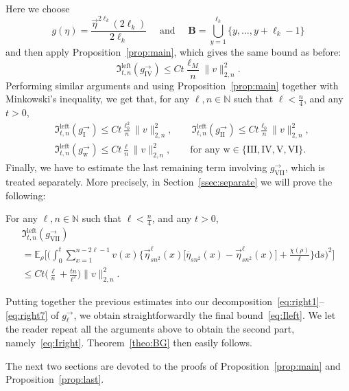 \documentclass[10pt]{amsart}
\theoremstyle{definition}\newtheorem{defi}[theo]{Definition}\newtheorem{rema}[theo]{Remark}\newtheorem{exam}[theo]{Example}\newtheorem{exem}[theo]{Example}\newtheorem{nota}[theo]{Notation}
\newcommand{\bfB}{\mathbf{B}}
\newcommand*{\rmw}{\mathrm{w}}
\newcommand*{\rmleft}{\mathrm{left}}
\newcommand*{\rmI}{\mathrm{I}}
\newcommand*{\rmII}{\mathrm{II}}
\newcommand*{\rmIII}{\mathrm{III}}
\newcommand*{\rmIV}{\mathrm{IV}}
\newcommand*{\rmV}{\mathrm{V}}
\newcommand*{\rmVI}{\mathrm{VI}}
\newcommand*{\rmVII}{\mathrm{VII}}
\newcommand{\bb}[1]{{\mathbb #1}}
\newcommand{\mf}[1]{{\mathfrak #1}}
\renewcommand\vec[1]{\overrightarrow{#1}}
\renewcommand{\bar}{\overline}
\renewcommand{\leq}{\leqslant}
\newcommand*{\dd}{\mathrm{d}}
\newcommand*{\ds}{\dd s}
\begin{document}
Here we choose
\[
g(\eta) = \frac{\vec\eta^{2\ell_k}(2\ell_k)}{2\ell_k} \quad \text{ and } \quad {\bfB} = \bigcup_{y=1}^{\ell_k} \big\{ y, \dots, y+\ell_k-1\big\}
\]
and then apply Proposition~\ref{prop:main}, which gives the same bound as before:
\[
\mf I_{t,n}^{\rmleft}(g^\rightarrow_{\rmIV}) \leq Ct \frac{\ell_{M}}{n}\|v\|_{2,n}^2.
\]
Performing similar arguments and using Proposition~\ref{prop:main} together with Minkowski's inequality, we get that, for any $\ell,n\in\bb N$ such that $\ell <\frac n 4$, and any $t>0$,
\begin{align*}
&\mf I_{t,n}^{\rmleft}(g^\rightarrow_{\rmI}) \leq Ct \frac{\ell_0^2}{n}\|v\|_{2,n}^2, \quad \quad
\mf I_{t,n}^{\rmleft}(g^\rightarrow_{\rmII}) \leq Ct \frac{\ell_0}{n}\|v\|_{2,n}^2, \\
&\mf I_{t,n}^{\rmleft}(g^\rightarrow_{\rmw}) \leq Ct \frac{\ell}{n}\|v\|_{2,n}^2, \qquad \text{for any } {\rmw} \in \{\rmIII, \rmIV, \rmV, \rmVI\}.
\end{align*}
Finally, we have to estimate the last remaining term involving $g_{\rmVII}^\rightarrow$, which is treated separately. More precisely, in Section~\ref{ssec:separate} we will prove the following:

\begin{prop}\label{prop:last}
For any $\ell,n\in\bb N$ such that $\ell <\frac n 4$, and any $t>0$,
\begin{multline}\label{eq:right7bis}
\mf I_{t,n}^{\rmleft}(g^\rightarrow_{\rmVII})\\
=\bb E_\rho\bigg[\bigg(\int_0^t \sum_{x=1}^{n-2\ell-1} v(x)\Big\{\vec\eta_{sn^2}^\ell(x) \Big[\bar\eta_{sn^2}(x)-\vec\eta_{sn^2}^\ell(x)\Big] + \frac{\chi(\rho)}{\ell}\Big\} \ds\bigg)^2\bigg]
\\ \leq Ct \bigg(\frac{\ell}{n}+\frac{tn}{\ell^2}\bigg)\|v\|_{2,n}^2.
\end{multline}
\end{prop}

Putting together the previous estimates into our decomposition~\eqref{eq:right1}--\eqref{eq:right7} of $g_\ell^\rightarrow$, we obtain straightforwardly the final bound~\eqref{eq:Ileft}. We let the reader repeat all the arguments above to obtain the second part, namely~\eqref{eq:Iright}. Theorem~\ref{theo:BG} then easily follows.

The next two sections are devoted to the proofs of Proposition~\ref{prop:main} and Proposition~\ref{prop:last}.
\end{document}
